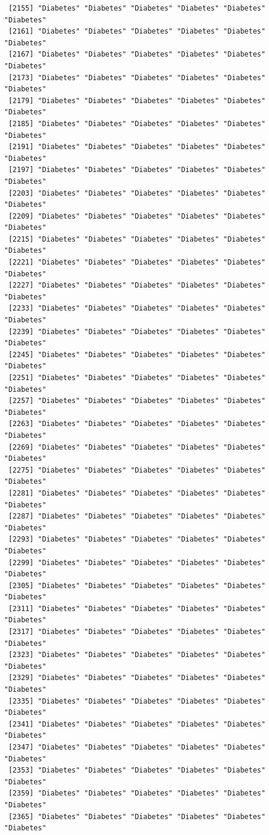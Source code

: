 \documentclass[
  letterpaper,
  DIV=11,
  numbers=noendperiod]{scrartcl}
\begin{document}
\begin{verbatim}
 [2155] "Diabetes" "Diabetes" "Diabetes" "Diabetes" "Diabetes" "Diabetes"
 [2161] "Diabetes" "Diabetes" "Diabetes" "Diabetes" "Diabetes" "Diabetes"
 [2167] "Diabetes" "Diabetes" "Diabetes" "Diabetes" "Diabetes" "Diabetes"
 [2173] "Diabetes" "Diabetes" "Diabetes" "Diabetes" "Diabetes" "Diabetes"
 [2179] "Diabetes" "Diabetes" "Diabetes" "Diabetes" "Diabetes" "Diabetes"
 [2185] "Diabetes" "Diabetes" "Diabetes" "Diabetes" "Diabetes" "Diabetes"
 [2191] "Diabetes" "Diabetes" "Diabetes" "Diabetes" "Diabetes" "Diabetes"
 [2197] "Diabetes" "Diabetes" "Diabetes" "Diabetes" "Diabetes" "Diabetes"
 [2203] "Diabetes" "Diabetes" "Diabetes" "Diabetes" "Diabetes" "Diabetes"
 [2209] "Diabetes" "Diabetes" "Diabetes" "Diabetes" "Diabetes" "Diabetes"
 [2215] "Diabetes" "Diabetes" "Diabetes" "Diabetes" "Diabetes" "Diabetes"
 [2221] "Diabetes" "Diabetes" "Diabetes" "Diabetes" "Diabetes" "Diabetes"
 [2227] "Diabetes" "Diabetes" "Diabetes" "Diabetes" "Diabetes" "Diabetes"
 [2233] "Diabetes" "Diabetes" "Diabetes" "Diabetes" "Diabetes" "Diabetes"
 [2239] "Diabetes" "Diabetes" "Diabetes" "Diabetes" "Diabetes" "Diabetes"
 [2245] "Diabetes" "Diabetes" "Diabetes" "Diabetes" "Diabetes" "Diabetes"
 [2251] "Diabetes" "Diabetes" "Diabetes" "Diabetes" "Diabetes" "Diabetes"
 [2257] "Diabetes" "Diabetes" "Diabetes" "Diabetes" "Diabetes" "Diabetes"
 [2263] "Diabetes" "Diabetes" "Diabetes" "Diabetes" "Diabetes" "Diabetes"
 [2269] "Diabetes" "Diabetes" "Diabetes" "Diabetes" "Diabetes" "Diabetes"
 [2275] "Diabetes" "Diabetes" "Diabetes" "Diabetes" "Diabetes" "Diabetes"
 [2281] "Diabetes" "Diabetes" "Diabetes" "Diabetes" "Diabetes" "Diabetes"
 [2287] "Diabetes" "Diabetes" "Diabetes" "Diabetes" "Diabetes" "Diabetes"
 [2293] "Diabetes" "Diabetes" "Diabetes" "Diabetes" "Diabetes" "Diabetes"
 [2299] "Diabetes" "Diabetes" "Diabetes" "Diabetes" "Diabetes" "Diabetes"
 [2305] "Diabetes" "Diabetes" "Diabetes" "Diabetes" "Diabetes" "Diabetes"
 [2311] "Diabetes" "Diabetes" "Diabetes" "Diabetes" "Diabetes" "Diabetes"
 [2317] "Diabetes" "Diabetes" "Diabetes" "Diabetes" "Diabetes" "Diabetes"
 [2323] "Diabetes" "Diabetes" "Diabetes" "Diabetes" "Diabetes" "Diabetes"
 [2329] "Diabetes" "Diabetes" "Diabetes" "Diabetes" "Diabetes" "Diabetes"
 [2335] "Diabetes" "Diabetes" "Diabetes" "Diabetes" "Diabetes" "Diabetes"
 [2341] "Diabetes" "Diabetes" "Diabetes" "Diabetes" "Diabetes" "Diabetes"
 [2347] "Diabetes" "Diabetes" "Diabetes" "Diabetes" "Diabetes" "Diabetes"
 [2353] "Diabetes" "Diabetes" "Diabetes" "Diabetes" "Diabetes" "Diabetes"
 [2359] "Diabetes" "Diabetes" "Diabetes" "Diabetes" "Diabetes" "Diabetes"
 [2365] "Diabetes" "Diabetes" "Diabetes" "Diabetes" "Diabetes" "Diabetes"

\end{verbatim}
\end{document}
